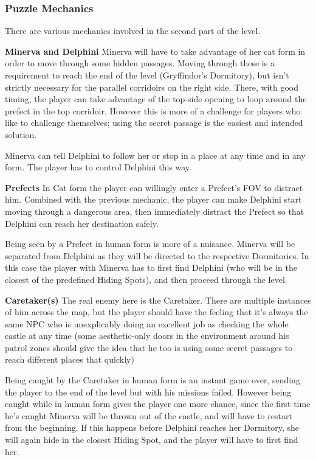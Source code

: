 \subsubsection{Puzzle Mechanics}

There are various mechanics involved in the second part of the level.

\textbf{Minerva and Delphini} Minerva will have to take advantage of her cat form in order to move through some hidden passages. Moving through these is a requirement to reach the end of the level (Gryffindor's Dormitory), but isn't strictly necessary for the parallel corridoirs on the right side. There, with good timing, the player can take advantage of the top-side opening to loop around the prefect in the top corridoir. However this is more of a challenge for players who like to challenge themselves; using the secret passage is the easiest and intended solution.

Minerva can tell Delphini to follow her or stop in a place at any time and in any form. The player has to control Delphini this way. 


\textbf{Prefects}
In Cat form the player can willingly enter a Prefect's FOV to distract him. Combined with the previous mechanic, the player can make Delphini start moving through a dangerous area, then immediately distract the Prefect so that Delphini can reach her destination safely.

Being seen by a Prefect in human form is more of a nuisance. Minerva will be separated from Delphini as they will be directed to the respective Dormitories. In this case the player with Minerva has to first find Delphini (who will be in the closest of the predefined Hiding Spots), and then proceed through the level.

\textbf{Caretaker(s)}
The real enemy here is the Caretaker. There are multiple instances of him across the map, but the player should have the feeling that it's always the same NPC who is unexplicably doing an excellent job as checking the whole castle at any time (some aesthetic-only doors in the environment around his patrol zones should give the idea that he too is using some secret passages to reach different places that quickly)

Being caught by the Caretaker in human form is an instant game over, sending the player to the end of the level but with his missions failed. However being caught while in human form gives the player one more chance, since the first time he's caught Minerva will be thrown out of the castle, and will have to restart from the beginning. If this happens before Delphini reaches her Dormitory, she will again hide in the closest Hiding Spot, and the player will have to first find her.

